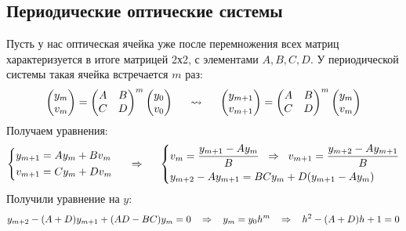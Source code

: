\subsection*{Периодические оптические системы}
Пусть у нас оптическая ячейка уже после перемножения всех матриц характеризуется в итоге матрицей 2х2, с элементами $A, B, C, D$.
У периодической системы такая ячейка встречается $m$ раз:
\begin{equation*}
	\begin{pmatrix}
		y_m \\ v_m
	\end{pmatrix}
	=
	\begin{pmatrix}
		A & B \\ C & D
	\end{pmatrix}^m
	\begin{pmatrix}
		y_0 \\ v_0
	\end{pmatrix}
	\hspace{0.5 cm}
	\leadsto
	\hspace{0.5 cm}
	\begin{pmatrix}
		y_{m+1} \\ v_{m+1}
	\end{pmatrix}
	=
	\begin{pmatrix}
		A & B \\ C & D
	\end{pmatrix}^m
	\begin{pmatrix}
		y_m \\ v_m
	\end{pmatrix}
\end{equation*}
Получаем уравнения:
\begin{equation*}
\left\{
	\begin{aligned}
		&y_{m+1} = A y_m + B v_m \\
		&v_{m+1} = C y_m + D v_m
	\end{aligned}
\right.
	\hspace{0.5 cm}
	\Rightarrow
	\hspace{0.5 cm}
\left\{
	\begin{aligned}
		&v_m = \frac{y_{m+1} - A y_m}{B} 
		\hspace{0.2 cm}
		\Rightarrow
		\hspace{0.2 cm}
		v_{m+1} = \frac{y_{m+2} - A y_{m+1} }{B} \\
		&y_{m+2} - A y_{m+1} = B C y_m +D(y_{m+1} - A y_m)
	\end{aligned}
\right.
\end{equation*}
Получили уравнение на $y$:
\begin{equation*}
	y_{m+2} - (A + D) y_{m+1} + (A D - B C) y_m = 0
	\hspace{0.3 cm}
	\Rightarrow
	\hspace{0.3 cm}
	y_m = y_0 h^m
	\hspace{0.3 cm}
	\Rightarrow
	\hspace{0.3 cm}
	h^2 - (A + D)h + 1 = 0	
\end{equation*}
